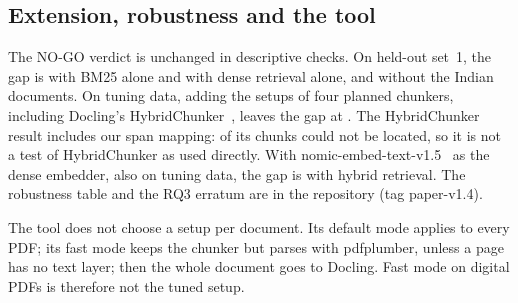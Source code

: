 \subsection{Extension, robustness and the tool}\label{sec:extension}

The NO-GO verdict is unchanged in descriptive checks. On held-out set~1, the gap is
\RobBMTwoFiveOnlyHeldOutOneGap{} \RobBMTwoFiveOnlyHeldOutOneGapCI{} with BM25 alone
and \RobDenseOnlyHeldOutOneGap{} \RobDenseOnlyHeldOutOneGapCI{} with dense retrieval
alone, and \RobWithoutIndianHeldOutOneGap{} \RobWithoutIndianHeldOutOneGapCI{}
without the Indian documents. On tuning data, adding the \ExtSetups{} setups of four
planned chunkers, including Docling's HybridChunker~\cite{hybridchunker}, leaves the
gap at \RobExtensionTuningGap{} \RobExtensionTuningGapCI{}. The HybridChunker result
includes our span mapping: \ExtHybridUnlocated{} of its \ExtHybridChunks{} chunks
could not be located, so it is not a test of HybridChunker as used directly. With
nomic-embed-text-v1.5~\cite{nomic} as the dense embedder, also on tuning data, the
gap is \RobNomicHybridTuningGap{} \RobNomicHybridTuningGapCI{} with hybrid
retrieval. The robustness table and the RQ3 erratum are in the repository (tag paper-v1.4).

The tool does not choose a setup per document. Its default mode applies
\RQoneTuningWinner{} to every PDF; its fast mode keeps the chunker but parses with
pdfplumber, unless a page has no text layer; then the whole document goes to
Docling. Fast mode on digital PDFs is therefore not the tuned setup.
